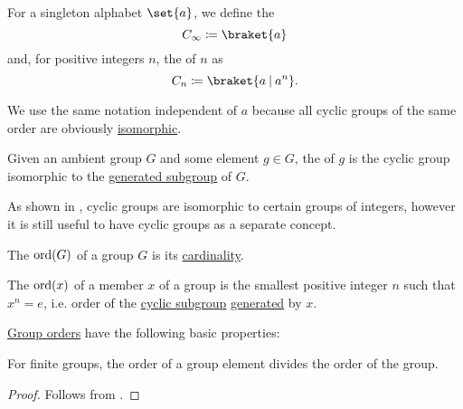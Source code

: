 \begin{definition}\label{def:cyclic_group}
  For a singleton alphabet \( \set{ a } \), we define the 
  \begin{equation*}
    C_\infty \coloneqq \braket{ a }
  \end{equation*}
  and, for positive integers \( n \), the  of  \( n \) as
  \begin{equation*}
    C_n \coloneqq \braket{ a \given a^n }.
  \end{equation*}

  We use the same notation independent of \( a \) because all cyclic groups of the same order are obviously \hyperref[def:group/homomorphism]{isomorphic}.

  Given an ambient group \( G \) and some element \( g \in G \), the  of \( g \) is the cyclic group isomorphic to the \hyperref[def:group/submodel]{generated subgroup} of \( G \).

  As shown in , cyclic groups are isomorphic to certain groups of integers, however it is still useful to have cyclic groups as a separate concept.
\end{definition}

\begin{definition}\label{def:group_order}
  The  \( \operatorname{ord}(G) \) of a group \( G \) is its \hyperref[thm:cardinality_existence]{cardinality}.

  The  \( \operatorname{ord}(x) \) of a member \( x \) of a group is the smallest positive integer \( n \) such that \( x^n = e \), i.e. order of the \hyperref[def:cyclic_group]{cyclic subgroup} \hyperref[def:group/submodel]{generated} by \( x \).
\end{definition}

\begin{proposition}\label{thm:def:group_order/properties}
  \hyperref[def:group_order]{Group orders} have the following basic properties:
  \begin{thmenum}
     For finite groups, the order of a group element divides the order of the group.
  \end{thmenum}
\end{proposition}
\begin{proof}
   Follows from .
\end{proof}

